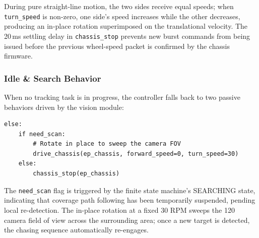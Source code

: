 During pure straight-line motion, the two sides receive equal speeds; when \texttt{turn\_speed} is non-zero, one side's speed increases while the other decreases,
producing an in-place rotation superimposed on the translational velocity. The 20\,ms
settling delay in \texttt{chassis\_stop} prevents new burst commands from being issued before the previous wheel-speed packet is confirmed by the chassis firmware.

\subsubsection{Idle \& Search Behavior}

When no tracking task is in progress, the controller falls back to two passive behaviors driven by the vision module:

\begin{verbatim}
else:
    if need_scan:
        # Rotate in place to sweep the camera FOV
        drive_chassis(ep_chassis, forward_speed=0, turn_speed=30)
    else:
        chassis_stop(ep_chassis)
\end{verbatim}

The \texttt{need\_scan} flag is triggered by the finite state machine's SEARCHING state, indicating that coverage path following
has been temporarily suspended, pending local re-detection. The in-place rotation at a fixed 30 RPM sweeps the 120\textdegree{} camera field of view across
the surrounding area; once a new target is detected, the chasing sequence automatically re-engages.